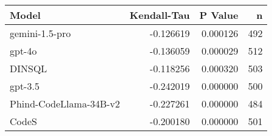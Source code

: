 \begin{tabular}{lrrr}
\toprule
Model & Kendall-Tau & P Value & n \\
\midrule
gemini-1.5-pro & -0.126619 & 0.000126 & 492 \\
gpt-4o & -0.136059 & 0.000029 & 512 \\
DINSQL & -0.118256 & 0.000320 & 503 \\
gpt-3.5 & -0.242019 & 0.000000 & 500 \\
Phind-CodeLlama-34B-v2 & -0.227261 & 0.000000 & 484 \\
CodeS & -0.200180 & 0.000000 & 501 \\
\bottomrule
\end{tabular}
